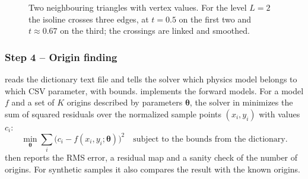 \documentclass{article}
\begin{document}
\begin{figure}[htbp]
\centering
{}
\caption{Two neighbouring triangles with vertex values. For the level
$L=2$ the isoline crosses three edges, at $t=0.5$ on the first two and
$t\approx0.67$ on the third; the crossings are linked and smoothed.}
\label{fig:tri}
\end{figure}

\subsubsection*{Step 4 -- Origin finding}

 reads the dictionary text file and tells the solver
which physics model belongs to which CSV parameter, with bounds.
 implements the forward models. For a model $f$ and a
set of $K$ origins described by parameters $\boldsymbol\theta$, the solver in
 minimizes the sum of squared residuals over the
normalized sample points $(x_i,y_i)$ with values $c_i$:
\begin{equation*}
  \min_{\boldsymbol\theta}\sum_i\bigl(c_i - f(x_i,y_i;\boldsymbol\theta)\bigr)^2
  \quad\text{subject to the bounds from the dictionary.}
\end{equation*}
 then reports the RMS error, a residual map
and a sanity check of the number of origins. For synthetic samples it also
compares the result with the known origins.
\end{document}

